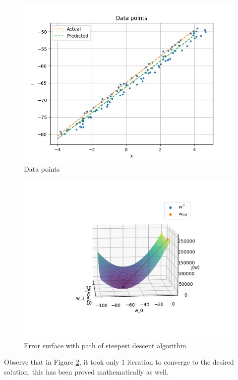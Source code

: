 \documentclass{article}
\begin{document}
\begin{figure}[H]
	\includegraphics[scale=0.5]{./figs/datapoints.png}
	\caption{Data points}
	\label{fig:dp}
\end{figure}
\begin{figure}[H]
	\includegraphics[scale=1]{./figs/3d.png}
	\caption{Error surface with path of steepest descent algorithm.}
	\label{fig:error}
\end{figure}
Observe that in Figure \ref{fig:error}, it took only 1 iteration to converge to the desired solution, this has been proved mathematically as well.
\end{document}
